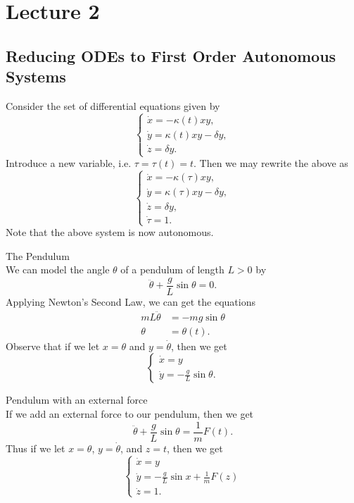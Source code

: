 \documentclass[class=article, crop=false]{standalone}
\begin{document}
  \section{Lecture 2}
  \subsection{Reducing ODEs to First Order Autonomous Systems}
  Consider the set of differential equations given by
  \[
    \begin{cases}
      \dot{x} = -\kappa(t)xy, \\
      \dot{y} = \kappa(t)xy - \delta y, \\
      \dot{z} = \delta y.
    \end{cases}
  \]
  Introduce a new variable, i.e. $\tau = \tau(t) = t$. Then we may rewrite the above as
  \[
    \begin{cases}
      \dot{x} = -\kappa(\tau)xy, \\
      \dot{y} = \kappa(\tau)xy - \delta y, \\
    \dot{z} = \delta y, \\
      \dot{\tau} = 1.
    \end{cases}
  \]
  Note that the above system is now autonomous.
  \begin{example}{The Pendulum} \\
    We can model the angle $\theta$ of a pendulum of length $L > 0$ by
    \[
      \ddot{\theta} + \frac{g}{L}\sin\theta = 0.
    \]
    Applying Newton's Second Law, we can get the equations
    \begin{align*}
      mL\ddot\theta &= -mg\sin\theta \\
      \theta &= \theta(t).
    \end{align*}
    Observe that if we let $x = \theta$ and $y = \dot{\theta}$, then we get
    \[
      \begin{cases}
        \dot{x} = y \\
        \dot{y} = -\frac{g}{L}\sin\theta.
      \end{cases}
    \]
  \end{example}
  \begin{example}{Pendulum with an external force} \\
    If we add an external force to our pendulum, then we get
    \[
      \ddot\theta + \frac{g}{L}\sin\theta = \frac{1}{m}F(t).
    \]
    Thus if we let $x = \theta$, $y = \dot{\theta}$, and $z = t$, then we get
    \[
      \begin{cases}
        \dot{x} = y \\
        \dot{y} = -\frac{g}{L}\sin x + \frac{1}{m}F(z) \\
        \dot{z} = 1.
      \end{cases}
    \]
  \end{example}
\end{document}
